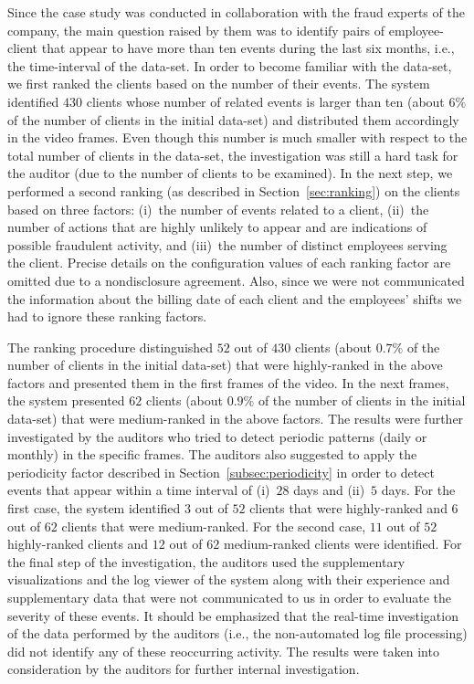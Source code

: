 \documentclass[conference]{IEEEtran}
\begin{document}
Since the case study was conducted in collaboration with the fraud
experts of the company, the main question raised by them was to
identify pairs of employee-client that appear to have more than ten
events during the last six months, i.e., the time-interval of the
data-set. In order to become familiar with the data-set, we first
ranked the clients based on the number of their events. The system
identified $430$ clients whose number of related events is larger
than ten (about $6\%$ of the number of clients in the initial
data-set) and distributed them accordingly in the video frames. Even
though this number is much smaller with respect to the total number
of clients in the data-set, the investigation was still a hard task
for the auditor (due to the number of clients to be examined). In
the next step, we performed a second ranking (as described in
Section~\ref{sec:ranking}) on the clients based on three factors:
(i)~the number of events related to a client, (ii)~the number of
actions that are highly unlikely to appear and are indications of
possible fraudulent activity, and (iii)~the number of distinct
employees serving the client. Precise details on the configuration
values of each ranking factor are omitted due to a nondisclosure
agreement. Also, since we were not communicated the information
about the billing date of each client and the employees' shifts we
had to ignore these ranking factors.

The ranking procedure distinguished $52$ out of $430$ clients (about
$0.7\%$ of the number of clients in the initial data-set) that were
highly-ranked in the above factors and presented them in the first
frames of the video. In the next frames, the system presented $62$
clients (about $0.9\%$ of the number of clients in the initial
data-set) that were medium-ranked in the above factors. The results
were further investigated by the auditors who tried to detect
periodic patterns (daily or monthly) in the specific frames. The
auditors also suggested to apply the periodicity factor described in
Section~\ref{subsec:periodicity} in order to detect events that
appear within a time interval of (i)~$28$ days and (ii)~$5$ days.
For the first case, the system identified $3$ out of $52$ clients
that were highly-ranked and $6$ out of $62$ clients that were
medium-ranked. For the second case, $11$ out of $52$ highly-ranked
clients and $12$ out of $62$ medium-ranked clients were identified.
For the final step of the investigation, the auditors used the
supplementary visualizations and the log viewer of the system along
with their experience and supplementary data that were not
communicated to us in order to evaluate the severity of these
events. It should be emphasized that the real-time investigation of
the data performed by the auditors (i.e., the non-automated log file
processing) did not identify any of these reoccurring activity. The
results were taken into consideration by the auditors for further
internal investigation.
\end{document}
